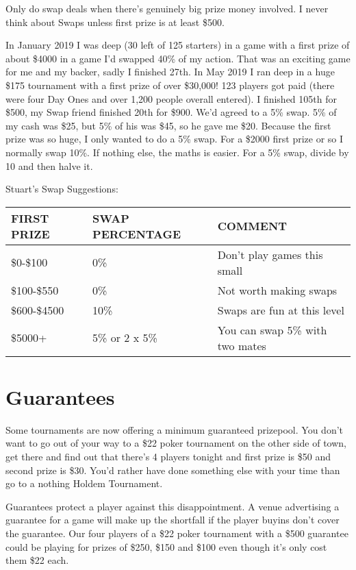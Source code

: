 Only do swap deals when there's genuinely big prize money involved.
I never think about Swaps unless first prize is at least \$500.

In January 2019 I was deep (30 left of 125 starters) in a game with
a first prize of about \$4000 in a game I'd swapped 40\% of my action.
That was an exciting game for me and my backer, sadly I finished
27th. In May 2019 I ran deep in a huge \$175 tournament with a first
prize of over \$30,000! 123 players got paid (there were four Day Ones
and over 1,200 people overall entered). I finished 105th for \$500, my
Swap friend finished 20th for \$900. We'd agreed to a 5\% swap.
5\% of my cash was \$25, but 5\% of his was \$45, so he gave me \$20.
Because the first prize was so huge, I only wanted to do a 5\% swap.
For a \$2000 first prize or so I normally swap 10\%. If nothing else,
the maths is easier. For a 5\% swap, divide by 10 and then halve it.

Stuart's Swap Suggestions:

\begin{tabular}{|l|l|l|} \hline
FIRST PRIZE & SWAP PERCENTAGE & COMMENT\\ \hline
\$0-\$100 & 0\% & Don't play games this small \\ \hline
\$100-\$550 & 0\%  & Not worth making swaps \\ \hline
\$600-\$4500 & 10\% & Swaps are fun at this level \\ \hline
\$5000+ & 5\% or 2 x 5\% & You can swap 5\% with two mates \\ \hline
\end{tabular}

\section{Guarantees}

Some tournaments are now offering a minimum guaranteed prizepool. You
don't want to go out of your way to a \$22 poker tournament on the
other side of town, get there and find out that there's 4 players tonight
and first prize is \$50 and second prize is \$30. You'd rather have
done something else with your time than go to a nothing Holdem Tournament.

Guarantees protect a player against this disappointment. A venue
advertising a guarantee for a game will make up the shortfall if the
player buyins don't cover the guarantee. Our four players of a \$22
poker tournament with a \$500 guarantee could be playing for prizes
of \$250, \$150 and \$100 even though it's only cost them \$22 each.

